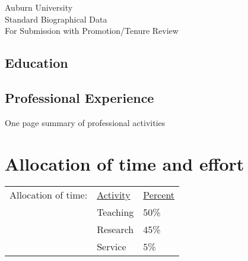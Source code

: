 


\newcommand{\longcontent}[1]{}

\newcommand{\oldcontent}[1]{}

\newcommand{\docTitle}{Biographical Data\xspace}


\singlespacing

\newpage


\bigskip
\begin{mytitle}
    Auburn University \\
    Standard Biographical Data \\
    For Submission with Promotion/Tenure Review
\end{mytitle}

\bigskip


\bigskip
\subsection*{Education}


\bigskip
\subsection*{Professional Experience}


\newpage

\begin{mytitle}
    One page summary of professional activities
\end{mytitle}



\newpage


\section{Allocation of time and effort}
\begin{tabular}{ l l l }
    Allocation of time: & \underline{Activity} & \underline{Percent} \\
    & Teaching & 50\% \\
    & Research & 45\% \\
    & Service & 5\% \\
\end{tabular}


